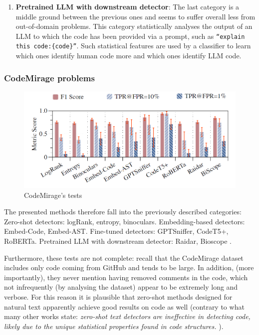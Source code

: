 \begin{enumerate}
    \item \textbf{Pretrained LLM with downstream detector}:
    The last category is a middle ground between the previous ones and seems to 
    suffer overall less from out-of-domain problems. This category statistically 
    analyses the output of an LLM to which the code has been provided via a prompt, 
    such as \texttt{“explain this code:\{code\}”}. Such statistical 
    features are used by a classifier to learn which ones identify 
    human code more and which ones identify 
    LLM code.
\end{enumerate}

\subsubsection{CodeMirage problems}

\begin{figure}[H]
    \centering
    \includegraphics[width=1\textwidth]{img/CodeMirage/tests.png}
    \caption{CodeMirage's tests}
    \label{fig:CodeMirage-tests}
\end{figure}

The presented methods therefore fall into the previously described categories:
Zero-shot detectors: logRank\cite{gehrmann2019gltr}, entropy\cite{lavergne2008detecting}, 
binoculars\cite{hans2024spotting}.
Embedding-based detectors: Embed-Code, Embed-AST.
Fine-tuned detectors: GPTSniffer\cite{nguyen2024gptsniffer}, CodeT5+\cite{wang2023codet5+}, RoBERTa\cite{liu2019roberta}.
Pretrained LLM with downstream detector: Raidar\cite{mao2024raidar}, Bioscope \cite{guo2024biscope}.


Furthermore, these tests are not complete: 
recall that the CodeMirage dataset includes 
only code coming from GitHub and tends to be 
large. In addition, (more importantly), 
they never mention having removed comments in the code, 
which not infrequently (by analysing the dataset) appear 
to be extremely long and verbose. For this reason it is 
plausible that zero-shot methods designed for natural text 
apparently achieve good results on code as well 
(contrary to what many other works state: 
\textit{ zero-shot text detectors are ineffective in detecting code, 
likely due to the unique statistical properties found in code structures.}
\cite{yang2023zero}
).

